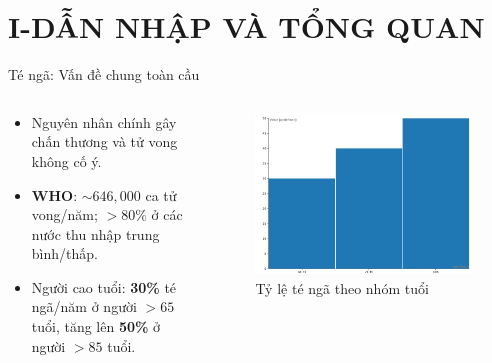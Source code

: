 
\section{I-DẪN NHẬP VÀ TỔNG QUAN}

\begin{frame}{Té ngã: Vấn đề chung toàn cầu}
    \begin{columns}[T]
        \begin{column}{0.48\textwidth}
            \begin{itemize}
                \item Nguyên nhân chính gây chấn thương và tử vong không cố ý.
                \item \textbf{WHO}: $\sim646,000$ ca tử vong/năm; $>80\%$ ở các nước thu nhập trung bình/thấp.
                \item Người cao tuổi: \textbf{30\%} té ngã/năm ở người $>65$ tuổi, tăng lên \textbf{50\%} ở người $>85$ tuổi.
            \end{itemize}
        \end{column}
        \begin{column}{0.48\textwidth}
            \begin{figure}
                \centering
                \includegraphics[width=\textwidth]{images/fall_status_who.png}
                \caption{Tỷ lệ té ngã theo nhóm tuổi}
            \end{figure}
        \end{column}
    \end{columns}
\end{frame}

